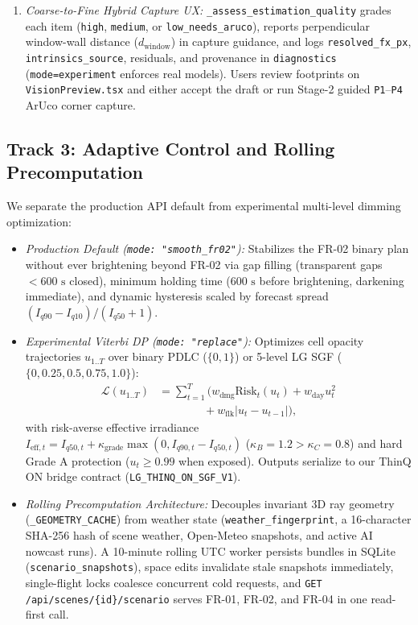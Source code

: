 \documentclass[conference]{IEEEtran}
\begin{document}
\begin{enumerate}
\item \textit{Coarse-to-Fine Hybrid Capture UX:} \texttt{\_assess\_estimation\_quality} grades each item (\texttt{high}, \texttt{medium}, or \texttt{low\_needs\_aruco}), reports perpendicular window-wall distance ($d_{\mathrm{window}}$) in capture guidance, and logs \texttt{resolved\_fx\_px}, \texttt{intrinsics\_source}, residuals, and provenance in \texttt{diagnostics} (\texttt{mode=experiment} enforces real models). Users review footprints on \texttt{VisionPreview.tsx} and either accept the draft or run Stage-2 guided \texttt{P1}--\texttt{P4} ArUco corner capture.
\end{enumerate}

\subsection{Track 3: Adaptive Control and Rolling Precomputation}
We separate the production API default from experimental multi-level dimming optimization:
\begin{itemize}
\item \textit{Production Default (\texttt{mode: "smooth\_fr02"}):} Stabilizes the FR-02 binary plan without ever brightening beyond FR-02 via gap filling (transparent gaps $< 600\text{ s}$ closed), minimum holding time ($600\text{ s}$ before brightening, darkening immediate), and dynamic hysteresis scaled by forecast spread $(I_{q90} - I_{q10}) / (I_{q50} + 1)$.
\item \textit{Experimental Viterbi DP (\texttt{mode: "replace"}):} Optimizes cell opacity trajectories $u_{1..T}$ over binary PDLC ($\{0, 1\}$) or 5-level LG SGF ($\{0, 0.25, 0.5, 0.75, 1.0\}$):
\begin{align}
\mathcal{L}(u_{1..T}) &= \sum_{t=1}^{T}\!\Big(w_{\mathrm{dmg}}\mathrm{Risk}_t(u_t) + w_{\mathrm{day}}u_t^2 \nonumber\\
&\qquad\qquad + w_{\mathrm{flk}}|u_t - u_{t-1}|\Big),
\label{eq:dp}
\end{align}
with risk-averse effective irradiance $I_{\mathrm{eff},t} = I_{q50,t} + \kappa_{\mathrm{grade}}\max(0, I_{q90,t} - I_{q50,t})$ ($\kappa_B = 1.2 > \kappa_C = 0.8$) and hard Grade A protection ($u_t \ge 0.99$ when exposed). Outputs serialize to our ThinQ ON bridge contract (\texttt{LG\_THINQ\_ON\_SGF\_V1}).
\item \textit{Rolling Precomputation Architecture:} Decouples invariant 3D ray geometry (\texttt{\_GEOMETRY\_CACHE}) from weather state (\texttt{weather\_fingerprint}, a 16-character SHA-256 hash of scene weather, Open-Meteo snapshots, and active AI nowcast runs). A 10-minute rolling UTC worker persists bundles in SQLite (\texttt{scenario\_snapshots}), space edits invalidate stale snapshots immediately, single-flight locks coalesce concurrent cold requests, and \texttt{GET /api/scenes/\{id\}/scenario} serves FR-01, FR-02, and FR-04 in one read-first call.
\end{itemize}
\end{document}
